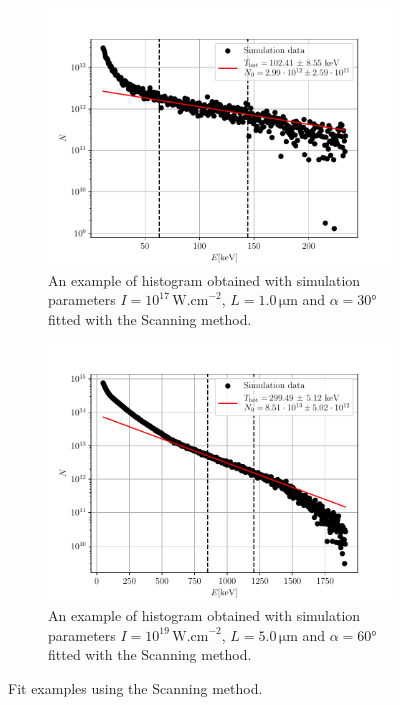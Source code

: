 \begin{figure}[ht]
	\centering
	\begin{subfigure}{0.49\textwidth}
		\centering
		\includegraphics[width=\textwidth]{figures/scan-ex1}
		\caption{An example of histogram obtained with simulation parameters $I=10^{17}\,\mathrm{W.cm}^{-2}$, $L=1.0\,\mathrm{\mu m}$ and $\alpha = 30$° fitted with the Scanning method.}
		\label{fig:scan-ex1-good}
	\end{subfigure}
	\hfill
	\begin{subfigure}{0.49\textwidth}
		\centering
		\includegraphics[width=\textwidth]{figures/scan-ex2}
		\caption{An example of histogram obtained with simulation parameters $I=10^{19}\,\mathrm{W.cm}^{-2}$, $L=5.0\,\mathrm{\mu m}$ and $\alpha = 60$° fitted with the Scanning method.}
		\label{fig:scan-ex2-good}
	\end{subfigure}
	\caption{Fit examples using the Scanning method.}
	\label{fig:scan-fit-good-example}
\end{figure}


